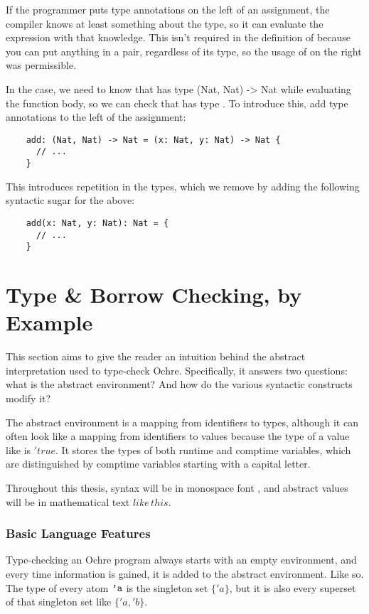 \documentclass[12pt,twoside]{report}
\begin{document}
If the programmer puts type annotations on the left of an assignment, the compiler knows at least something about the type, so it can evaluate the expression with that knowledge. This isn't required in the definition of  because you can put anything in a pair, regardless of its type, so the usage of  on the right was permissible.

In the  case, we need to know that  has type {(Nat, Nat) -> Nat} while evaluating the function body, so we can check that  has type . To introduce this, add type annotations to the left of the assignment:

  \begin{verbatim}
    add: (Nat, Nat) -> Nat = (x: Nat, y: Nat) -> Nat {
      // ...
    }
  \end{verbatim}

This introduces repetition in the types, which we remove by adding the following syntactic sugar for the above:

  \begin{verbatim}
    add(x: Nat, y: Nat): Nat = {
      // ...
    }
  \end{verbatim}

\section{Type \& Borrow Checking, by Example}
\label{section:checkingexample}
This section aims to give the reader an intuition behind the abstract interpretation used to type-check Ochre. Specifically, it answers two questions: what is the abstract environment? And how do the various syntactic constructs modify it?

The abstract environment is a mapping from identifiers to types, although it can often look like a mapping from identifiers to values because the type of a value like  is $'true$. It stores the types of both runtime and comptime variables, which are distinguished by comptime variables starting with a capital letter.

Throughout this thesis, syntax will be in monospace font , and abstract values will be in mathematical text $like\,this$.

\subsubsection{Basic Language Features}
Type-checking an Ochre program always starts with an empty environment, and every time information is gained, it is added to the abstract environment. Like so. The type of every atom $\text{\texttt{'a}}$ is the singleton set $\{'a\}$, but it is also every superset of that singleton set like $\{'a, 'b\}$.
\end{document}
